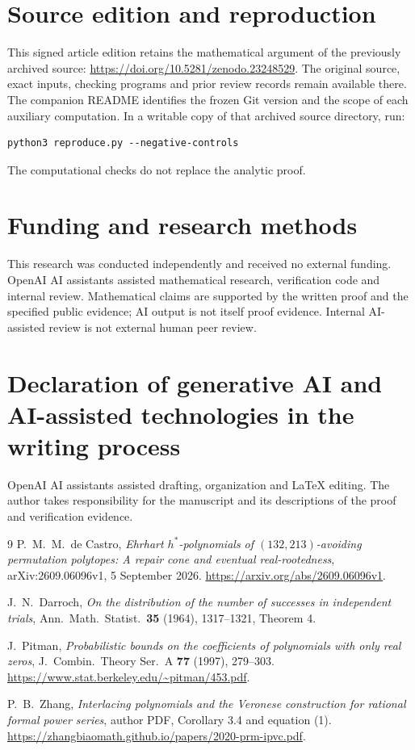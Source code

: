 \documentclass[11pt]{article}
\theoremstyle{remark}\newtheorem{remark}[theorem]{Remark}
\begin{document}
\section*{Source edition and reproduction}
This signed article edition retains the mathematical argument of the
previously archived source: \url{https://doi.org/10.5281/zenodo.23248529}.
The original source, exact inputs, checking programs and prior review
records remain available there. The companion README identifies the
frozen Git version and the scope of each auxiliary computation.
In a writable copy of that archived source directory, run:
\begin{verbatim}
python3 reproduce.py --negative-controls
\end{verbatim}
The computational checks do not replace the analytic proof.

\section*{Funding and research methods}
This research was conducted independently and received no external
funding. OpenAI AI assistants assisted mathematical research, verification
code and internal review. Mathematical claims are supported by the
written proof and the specified public evidence; AI output is not itself
proof evidence. Internal AI-assisted review is not external human peer
review.
\section*{Declaration of generative AI and AI-assisted technologies
in the writing process}
OpenAI AI assistants assisted drafting, organization and LaTeX editing.
The author takes responsibility for the manuscript and its descriptions
of the proof and verification evidence.

\begin{thebibliography}{9}
P.~M.~M.~de Castro,
\emph{Ehrhart $h^*$-polynomials of $(132,213)$-avoiding permutation
polytopes: A repair cone and eventual real-rootedness},
arXiv:2609.06096v1, 5 September 2026.
\url{https://arxiv.org/abs/2609.06096v1}.

J.~N.~Darroch,
\emph{On the distribution of the number of successes in independent trials},
Ann.\ Math.\ Statist.\ \textbf{35} (1964), 1317--1321, Theorem 4.

J.~Pitman,
\emph{Probabilistic bounds on the coefficients of polynomials with only real zeros},
J.\ Combin.\ Theory Ser.\ A \textbf{77} (1997), 279--303.
\url{https://www.stat.berkeley.edu/~pitman/453.pdf}.

P.~B.~Zhang,
\emph{Interlacing polynomials and the Veronese construction for rational
formal power series}, author PDF, Corollary 3.4 and equation (1).
\url{https://zhangbiaomath.github.io/papers/2020-prm-ipvc.pdf}.
\end{thebibliography}
\end{document}
